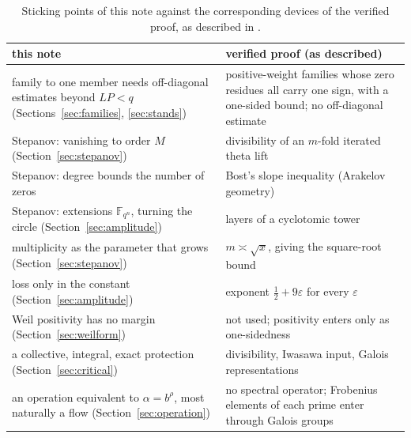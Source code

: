 \documentclass[11pt,a4paper]{article}
\theoremstyle{definition}\newtheorem{definition}[proposition]{Definition}
\theoremstyle{remark}\newtheorem{remark}[proposition]{Remark}
\begin{document}
\begin{table}[ht]\centering\small
\caption{Sticking points of this note against the corresponding devices of the verified proof, as described in \cite{Guide2026}.}\label{tab:verified}
\begin{tabular}{p{}p{}}
\toprule
this note & verified proof (as described)\\
\midrule
family to one member needs off-diagonal estimates beyond $LP<q$ (Sections~\ref{sec:families}, \ref{sec:stands}) & positive-weight families whose zero residues all carry one sign, with a one-sided bound; no off-diagonal estimate\\
Stepanov: vanishing to order $M$ (Section~\ref{sec:stepanov}) & divisibility of an $m$-fold iterated theta lift\\
Stepanov: degree bounds the number of zeros & Bost's slope inequality (Arakelov geometry)\\
Stepanov: extensions $\mathbb F_{q^n}$, turning the circle (Section~\ref{sec:amplitude}) & layers of a cyclotomic tower\\
multiplicity as the parameter that grows (Section~\ref{sec:stepanov}) & $m\asymp\sqrt x$, giving the square-root bound\\
loss only in the constant (Section~\ref{sec:amplitude}) & exponent $\tfrac12+9\varepsilon$ for every $\varepsilon$\\
Weil positivity has no margin (Section~\ref{sec:weilform}) & not used; positivity enters only as one-sidedness\\
a collective, integral, exact protection (Section~\ref{sec:critical}) & divisibility, Iwasawa input, Galois representations\\
an operation equivalent to $\alpha=b^\rho$, most naturally a flow (Section~\ref{sec:operation}) & no spectral operator; Frobenius elements of each prime enter through Galois groups\\
\bottomrule
\end{tabular}
\end{table}
\end{document}
